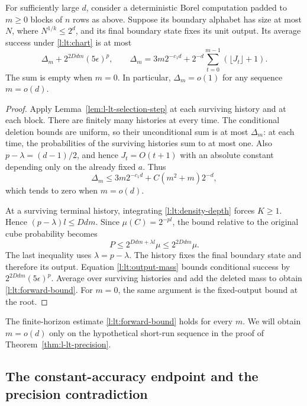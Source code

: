 \begin{proposition}
\label{prop:l-lt-forward}
For sufficiently large $d$, consider a deterministic Borel
computation padded to $m\ge0$ blocks of $n$ rows as above.  Suppose its
boundary alphabet has size at most $N$, where $N^{1/k}\le2^d$, and
its final boundary state fixes its unit output.  Its average success
under \eqref{l:lt:chart} is at most
\begin{equation}\label{l:lt:forward-bound}
 \Delta_m+2^{2Ddm}(5\epsilon)^p,\qquad
 \Delta_m=3m2^{-c_1d}
       +2^{-d}\sum_{t=0}^{m-1}(\lfloor J_t\rfloor+1).
\end{equation}
The sum is empty when $m=0$.  In particular,
$\Delta_m=o(1)$ for any sequence $m=o(d)$.
\end{proposition}
\begin{proof}
Apply Lemma~\ref{lem:l-lt-selection-step} at each surviving history
and at each block.  There are finitely many histories at every time.
The conditional deletion bounds are uniform, so their unconditional
sum is at most $\Delta_m$: at each time, the probabilities of the
surviving histories sum to at most one.  Also
$p-\lambda=(d-1)/2$, and hence $J_t=O(t+1)$ with an absolute constant
depending only on the already fixed $a$.  Thus
\[
 \Delta_m\le3m2^{-c_1d}+C(m^2+m)2^{-d},
\]
which tends to zero when $m=o(d)$.

At a surviving terminal history, integrating
\eqref{l:lt:density-depth} forces $K\ge1$.  Hence
$(p-\lambda)l\le Ddm$.  Since $\mu(C)=2^{-pl}$, the bound relative
to the original cube probability becomes
\begin{equation}\label{l:lt:terminal-density}
 P\le2^{Ddm+\lambda l}\mu\le2^{2Ddm}\mu.
\end{equation}
The last inequality uses $\lambda=p-\lambda$.  The history fixes the
final boundary state and therefore its output.  Equation
\eqref{l:lt:output-mass} bounds conditional success by
$2^{2Ddm}(5\epsilon)^p$.  Average over surviving histories and add
the deleted mass to obtain \eqref{l:lt:forward-bound}.  For $m=0$,
the same argument is the fixed-output bound at the root.
\end{proof}

The finite-horizon estimate \eqref{l:lt:forward-bound} holds for every
$m$.  We will obtain $m=o(d)$ only on the hypothetical short-run
sequence in the proof of Theorem~\ref{thm:l-lt-precision}.

\subsection{The constant-accuracy endpoint and the precision contradiction}
\label{subsec:l-lt-endgame}

